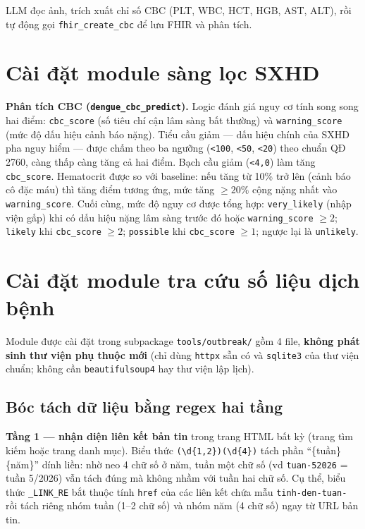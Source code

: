 \documentclass[a4paper,13pt,3p,twoside,openany]{report}
\theoremstyle{definition}
\theoremstyle{remark}
\theoremstyle{definition}
\let\ORIGsection\section
\let\ORIGsubsection\subsection
\renewcommand{\section}{\needspace{3\baselineskip}\ORIGsection}
\renewcommand{\subsection}{\needspace{3\baselineskip}\ORIGsubsection}
\begin{document}
LLM đọc ảnh, trích xuất chỉ số CBC (PLT, WBC, HCT, HGB, AST, ALT), rồi tự động gọi \texttt{fhir\_create\_cbc} để lưu FHIR và phân tích.

\section{Cài đặt module sàng lọc SXHD}

\textbf{Phân tích CBC (\texttt{dengue\_cbc\_predict}).} Logic đánh giá nguy cơ tính song song hai điểm: \texttt{cbc\_score} (số tiêu chí cận lâm sàng bất thường) và \texttt{warning\_score} (mức độ dấu hiệu cảnh báo nặng). Tiểu cầu giảm --- dấu hiệu chính của SXHD pha nguy hiểm --- được chấm theo ba ngưỡng (\texttt{<100}, \texttt{<50}, \texttt{<20}) theo chuẩn QĐ 2760, càng thấp càng tăng cả hai điểm. Bạch cầu giảm (\texttt{<4{,}0}) làm tăng \texttt{cbc\_score}. Hematocrit được so với baseline: nếu tăng từ 10\% trở lên (cảnh báo cô đặc máu) thì tăng điểm tương ứng, mức tăng $\geq 20\%$ cộng nặng nhất vào \texttt{warning\_score}. Cuối cùng, mức độ nguy cơ được tổng hợp: \texttt{very\_likely} (nhập viện gấp) khi có dấu hiệu nặng lâm sàng trước đó hoặc \texttt{warning\_score} $\geq 2$; \texttt{likely} khi \texttt{cbc\_score} $\geq 2$; \texttt{possible} khi \texttt{cbc\_score} $\geq 1$; ngược lại là \texttt{unlikely}.

\section{Cài đặt module tra cứu số liệu dịch bệnh}

Module được cài đặt trong subpackage \texttt{tools/outbreak/} gồm 4 file, \textbf{không phát sinh thư viện phụ thuộc mới} (chỉ dùng \texttt{httpx} sẵn có và \texttt{sqlite3} của thư viện chuẩn; không cần \texttt{beautifulsoup4} hay thư viện lập lịch).

\subsection{Bóc tách dữ liệu bằng regex hai tầng}

\textbf{Tầng 1 --- nhận diện liên kết bản tin} trong trang HTML bất kỳ (trang tìm kiếm hoặc trang danh mục). Biểu thức \texttt{(\textbackslash d\{1,2\})(\textbackslash d\{4\})} tách phần ``\{tuần\}\{năm\}'' dính liền: nhờ neo 4 chữ số ở năm, tuần một chữ số (vd \texttt{tuan-52026} = tuần 5/2026) vẫn tách đúng mà không nhầm với tuần hai chữ số. Cụ thể, biểu thức \texttt{\_LINK\_RE} bắt thuộc tính \texttt{href} của các liên kết chứa mẫu \texttt{tinh-den-tuan-} rồi tách riêng nhóm tuần (1--2 chữ số) và nhóm năm (4 chữ số) ngay từ URL bản tin.
\end{document}
